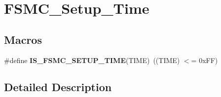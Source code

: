 \hypertarget{group___f_s_m_c___setup___time}{\section{F\-S\-M\-C\-\_\-\-Setup\-\_\-\-Time}
\label{group___f_s_m_c___setup___time}
}
\subsection*{Macros}
\begin{DoxyCompactItemize}
\item 
\hypertarget{group___f_s_m_c___setup___time_ga4f2fbb8f6ec492cc241a49c468e0d98d}{\#define {\bfseries I\-S\-\_\-\-F\-S\-M\-C\-\_\-\-S\-E\-T\-U\-P\-\_\-\-T\-I\-M\-E}(T\-I\-M\-E)~((T\-I\-M\-E) $<$= 0x\-F\-F)}\label{group___f_s_m_c___setup___time_ga4f2fbb8f6ec492cc241a49c468e0d98d}

\end{DoxyCompactItemize}


\subsection{Detailed Description}

